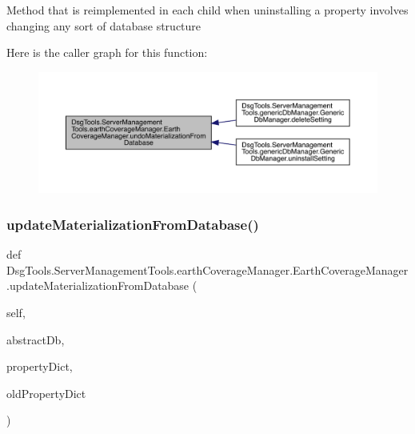 \begin{DoxyVerb}Method that is reimplemented in each child when uninstalling a property involves changing any sort of database structure
\end{DoxyVerb}
 Here is the caller graph for this function\+:
\nopagebreak
\begin{figure}[H]
\begin{center}
\leavevmode
\includegraphics[width=350pt]{class_dsg_tools_1_1_server_management_tools_1_1earth_coverage_manager_1_1_earth_coverage_manager_a57d96153e643d66180678145e086b07a_icgraph}
\end{center}
\end{figure}
\mbox{\label{class_dsg_tools_1_1_server_management_tools_1_1earth_coverage_manager_1_1_earth_coverage_manager_a50e332bb5bd3aae306177fc65db5e910}} 
\subsubsection{\texorpdfstring{update\+Materialization\+From\+Database()}{updateMaterializationFromDatabase()}}
{\footnotesize\ttfamily def Dsg\+Tools.\+Server\+Management\+Tools.\+earth\+Coverage\+Manager.\+Earth\+Coverage\+Manager.\+update\+Materialization\+From\+Database (\begin{DoxyParamCaption}\item[{}]{self,  }\item[{}]{abstract\+Db,  }\item[{}]{property\+Dict,  }\item[{}]{old\+Property\+Dict }\end{DoxyParamCaption})}


